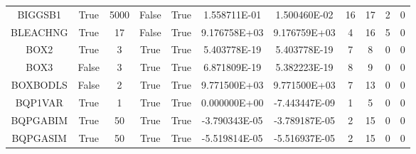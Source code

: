 \begin{longtable}{ccccccccccc}
	\cellcolor{default1} BIGGSB1& \cellcolor{default1} True& \cellcolor{default1} 5000& \cellcolor{default1} False& \cellcolor{default1} True& \cellcolor{poor} 1.558711E-01& \cellcolor{best} 1.500460E-02& \cellcolor{best} 16& \cellcolor{ok} 17& \cellcolor{default1} 2& \cellcolor{default1} 0\\
	\cellcolor{default2} BLEACHNG& \cellcolor{default2} True& \cellcolor{default2} 17& \cellcolor{default2} False& \cellcolor{default2} True& \cellcolor{best} 9.176758E+03& \cellcolor{ok} 9.176759E+03& \cellcolor{best} 4& \cellcolor{poor} 16& \cellcolor{default2} 5& \cellcolor{default2} 0\\
	\cellcolor{default1} BOX2& \cellcolor{default1} True& \cellcolor{default1} 3& \cellcolor{default1} True& \cellcolor{default1} True& \cellcolor{ok} 5.403778E-19& \cellcolor{best} 5.403778E-19& \cellcolor{best} 7& \cellcolor{ok} 8& \cellcolor{default1} 0& \cellcolor{default1} 0\\
	\cellcolor{default2} BOX3& \cellcolor{default2} False& \cellcolor{default2} 3& \cellcolor{default2} True& \cellcolor{default2} True& \cellcolor{ok} 6.871809E-19& \cellcolor{best} 5.382223E-19& \cellcolor{best} 8& \cellcolor{ok} 9& \cellcolor{default2} 0& \cellcolor{default2} 0\\
	\cellcolor{default1} BOXBODLS& \cellcolor{default1} False& \cellcolor{default1} 2& \cellcolor{default1} True& \cellcolor{default1} True& \cellcolor{best} 9.771500E+03& \cellcolor{best} 9.771500E+03& \cellcolor{best} 7& \cellcolor{ok} 13& \cellcolor{default1} 0& \cellcolor{default1} 0\\
	\cellcolor{default2} BQP1VAR& \cellcolor{default2} True& \cellcolor{default2} 1& \cellcolor{default2} True& \cellcolor{default2} True& \cellcolor{ok} 0.000000E+00& \cellcolor{best} -7.443447E-09& \cellcolor{best} 1& \cellcolor{poor} 5& \cellcolor{default2} 0& \cellcolor{default2} 0\\
	\cellcolor{default1} BQPGABIM& \cellcolor{default1} True& \cellcolor{default1} 50& \cellcolor{default1} True& \cellcolor{default1} True& \cellcolor{best} -3.790343E-05& \cellcolor{ok} -3.789187E-05& \cellcolor{best} 2& \cellcolor{poor} 15& \cellcolor{default1} 0& \cellcolor{default1} 0\\
	\cellcolor{default2} BQPGASIM& \cellcolor{default2} True& \cellcolor{default2} 50& \cellcolor{default2} True& \cellcolor{default2} True& \cellcolor{best} -5.519814E-05& \cellcolor{ok} -5.516937E-05& \cellcolor{best} 2& \cellcolor{poor} 15& \cellcolor{default2} 0& \cellcolor{default2} 0\\

\end{longtable}
